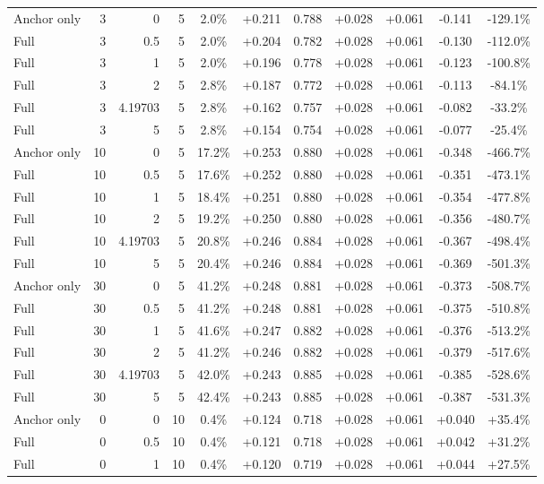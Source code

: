 \begin{table}[htbp]
\begin{tabular}{lrrrccccccc}
Anchor only & 3 & 0 & 5 & 2.0\% & +0.211 & 0.788 & +0.028 & +0.061 & -0.141 & -129.1\% \\
Full & 3 & 0.5 & 5 & 2.0\% & +0.204 & 0.782 & +0.028 & +0.061 & -0.130 & -112.0\% \\
Full & 3 & 1 & 5 & 2.0\% & +0.196 & 0.778 & +0.028 & +0.061 & -0.123 & -100.8\% \\
Full & 3 & 2 & 5 & 2.8\% & +0.187 & 0.772 & +0.028 & +0.061 & -0.113 & -84.1\% \\
Full & 3 & 4.19703 & 5 & 2.8\% & +0.162 & 0.757 & +0.028 & +0.061 & -0.082 & -33.2\% \\
Full & 3 & 5 & 5 & 2.8\% & +0.154 & 0.754 & +0.028 & +0.061 & -0.077 & -25.4\% \\
Anchor only & 10 & 0 & 5 & 17.2\% & +0.253 & 0.880 & +0.028 & +0.061 & -0.348 & -466.7\% \\
Full & 10 & 0.5 & 5 & 17.6\% & +0.252 & 0.880 & +0.028 & +0.061 & -0.351 & -473.1\% \\
Full & 10 & 1 & 5 & 18.4\% & +0.251 & 0.880 & +0.028 & +0.061 & -0.354 & -477.8\% \\
Full & 10 & 2 & 5 & 19.2\% & +0.250 & 0.880 & +0.028 & +0.061 & -0.356 & -480.7\% \\
Full & 10 & 4.19703 & 5 & 20.8\% & +0.246 & 0.884 & +0.028 & +0.061 & -0.367 & -498.4\% \\
Full & 10 & 5 & 5 & 20.4\% & +0.246 & 0.884 & +0.028 & +0.061 & -0.369 & -501.3\% \\
Anchor only & 30 & 0 & 5 & 41.2\% & +0.248 & 0.881 & +0.028 & +0.061 & -0.373 & -508.7\% \\
Full & 30 & 0.5 & 5 & 41.2\% & +0.248 & 0.881 & +0.028 & +0.061 & -0.375 & -510.8\% \\
Full & 30 & 1 & 5 & 41.6\% & +0.247 & 0.882 & +0.028 & +0.061 & -0.376 & -513.2\% \\
Full & 30 & 2 & 5 & 41.2\% & +0.246 & 0.882 & +0.028 & +0.061 & -0.379 & -517.6\% \\
Full & 30 & 4.19703 & 5 & 42.0\% & +0.243 & 0.885 & +0.028 & +0.061 & -0.385 & -528.6\% \\
Full & 30 & 5 & 5 & 42.4\% & +0.243 & 0.885 & +0.028 & +0.061 & -0.387 & -531.3\% \\
Anchor only & 0 & 0 & 10 & 0.4\% & +0.124 & 0.718 & +0.028 & +0.061 & +0.040 & +35.4\% \\
Full & 0 & 0.5 & 10 & 0.4\% & +0.121 & 0.718 & +0.028 & +0.061 & +0.042 & +31.2\% \\
Full & 0 & 1 & 10 & 0.4\% & +0.120 & 0.719 & +0.028 & +0.061 & +0.044 & +27.5\% \\

\end{tabular}
\end{table}

